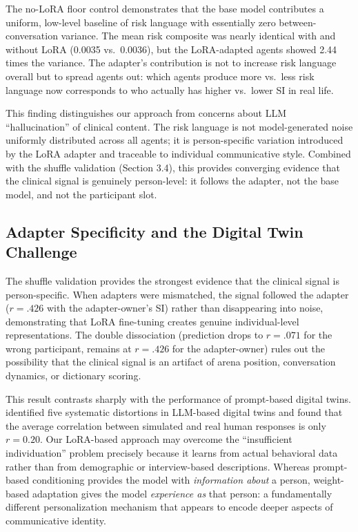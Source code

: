 \documentclass[review,12pt,authoryear]{elsarticle}
\begin{document}
The no-LoRA floor control demonstrates that the base model contributes a uniform, low-level baseline of risk language with essentially zero between-conversation variance. The mean risk composite was nearly identical with and without LoRA (0.0035 vs.\ 0.0036), but the LoRA-adapted agents showed 2.44 times the variance. The adapter's contribution is not to increase risk language overall but to spread agents out: which agents produce more vs.\ less risk language now corresponds to who actually has higher vs.\ lower SI in real life.

This finding distinguishes our approach from concerns about LLM ``hallucination'' of clinical content. The risk language is not model-generated noise uniformly distributed across all agents; it is person-specific variation introduced by the LoRA adapter and traceable to individual communicative style. Combined with the shuffle validation (Section 3.4), this provides converging evidence that the clinical signal is genuinely person-level: it follows the adapter, not the base model, and not the participant slot.

\subsection{Adapter Specificity and the Digital Twin Challenge}

The shuffle validation provides the strongest evidence that the clinical signal is person-specific. When adapters were mismatched, the signal followed the adapter ($r = .426$ with the adapter-owner's SI) rather than disappearing into noise, demonstrating that LoRA fine-tuning creates genuine individual-level representations. The double dissociation (prediction drops to $r = .071$ for the wrong participant, remains at $r = .426$ for the adapter-owner) rules out the possibility that the clinical signal is an artifact of arena position, conversation dynamics, or dictionary scoring.

This result contrasts sharply with the performance of prompt-based digital twins. \citet{peng2025funhouse} identified five systematic distortions in LLM-based digital twins and found that the average correlation between simulated and real human responses is only $r = 0.20$. Our LoRA-based approach may overcome the ``insufficient individuation'' problem precisely because it learns from actual behavioral data rather than from demographic or interview-based descriptions. Whereas prompt-based conditioning provides the model with \textit{information about} a person, weight-based adaptation gives the model \textit{experience as} that person: a fundamentally different personalization mechanism that appears to encode deeper aspects of communicative identity.
\end{document}
